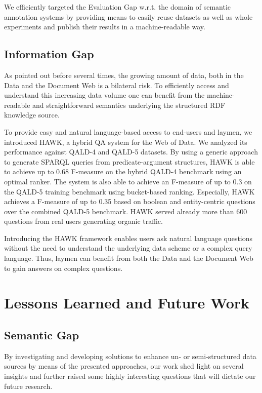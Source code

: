 We efficiently targeted the Evaluation Gap w.r.t. the domain of semantic annotation systems by providing means to easily reuse datasets as well as whole experiments and publish their results in a machine-readable way.

\subsection*{Information Gap}

As pointed out before several times, the growing amount of data, both in the Data and the Document Web is a bilateral risk. 
To efficiently access and understand this increasing data volume one can benefit from the machine-readable and straightforward semantics underlying the structured RDF knowledge source. 

To provide easy and natural language-based access to end-users and laymen, we introduced HAWK, a hybrid \ac{QA} system for the Web of Data.
We analyzed its performance against \ac{QALD}-4 and \ac{QALD}-5 datasets.
By using a generic approach to generate SPARQL queries from predicate-argument structures,   HAWK is able to achieve up to 0.68 F-measure on the hybrid \ac{QALD}-4 benchmark using an optimal ranker.
The system is also able to achieve an F-measure of up to 0.3 on the \ac{QALD}-5 training benchmark using bucket-based ranking.
Especially, HAWK achieves a F-measure of up to 0.35 based on boolean and entity-centric questions over the combined \ac{QALD}-5 benchmark.
HAWK served already more than 600 questions from real users generating organic traffic.

Introducing the HAWK framework enables users ask natural language questions without the need to understand the underlying data scheme or a complex query language. 
Thus, laymen can benefit from both the Data and the Document Web to gain answers on complex questions. 



\section{Lessons Learned and Future Work}
\subsection*{Semantic Gap}

By investigating and developing solutions to enhance un- or semi-structured data sources by means of the presented approaches, our work shed light on several insights and further raised some highly interesting questions that will dictate our future research. 

